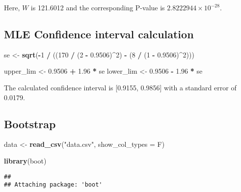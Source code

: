\documentclass[
  11pt,
]{article}
\newenvironment{Shaded}{\begin{snugshade}}{\end{snugshade}}
\newcommand{\AttributeTok}[1]{\textcolor[rgb]{0.13,0.29,0.53}{#1}}
\newcommand{\DecValTok}[1]{\textcolor[rgb]{0.00,0.00,0.81}{#1}}
\newcommand{\FloatTok}[1]{\textcolor[rgb]{0.00,0.00,0.81}{#1}}
\newcommand{\FunctionTok}[1]{\textcolor[rgb]{0.13,0.29,0.53}{\textbf{#1}}}
\newcommand{\NormalTok}[1]{#1}
\newcommand{\OtherTok}[1]{\textcolor[rgb]{0.56,0.35,0.01}{#1}}
\newcommand{\SpecialCharTok}[1]{\textcolor[rgb]{0.81,0.36,0.00}{\textbf{#1}}}
\newcommand{\StringTok}[1]{\textcolor[rgb]{0.31,0.60,0.02}{#1}}
\begin{document}
Here, \(W\) is 121.6012 and the corresponding P-value is
\ensuremath{2.8222944\times 10^{-28}}.

\hypertarget{mle-confidence-interval-calculation}{%
\subsection{MLE Confidence interval
calculation}\label{mle-confidence-interval-calculation}}

\begin{Shaded}
\begin{Highlighting}[]
\NormalTok{se }\OtherTok{\textless{}{-}} \FunctionTok{sqrt}\NormalTok{(}\SpecialCharTok{{-}}\DecValTok{1} \SpecialCharTok{/}\NormalTok{ ((}\DecValTok{170} \SpecialCharTok{/}\NormalTok{ (}\DecValTok{2} \SpecialCharTok{{-}} \FloatTok{0.9506}\NormalTok{)}\SpecialCharTok{\^{}}\DecValTok{2}\NormalTok{) }\SpecialCharTok{{-}}\NormalTok{ (}\DecValTok{8} \SpecialCharTok{/}\NormalTok{ (}\DecValTok{1} \SpecialCharTok{{-}} \FloatTok{0.9506}\NormalTok{)}\SpecialCharTok{\^{}}\DecValTok{2}\NormalTok{)))}

\NormalTok{upper\_lim }\OtherTok{\textless{}{-}} \FloatTok{0.9506} \SpecialCharTok{+} \FloatTok{1.96} \SpecialCharTok{*}\NormalTok{ se}
\NormalTok{lower\_lim }\OtherTok{\textless{}{-}} \FloatTok{0.9506} \SpecialCharTok{{-}} \FloatTok{1.96} \SpecialCharTok{*}\NormalTok{ se}
\end{Highlighting}
\end{Shaded}

The calculated confidence interval is {[}0.9155, 0.9856{]} with a
standard error of 0.0179.

\hypertarget{bootstrap-1}{%
\subsection{Bootstrap}\label{bootstrap-1}}

\begin{Shaded}
\begin{Highlighting}[]
\NormalTok{data }\OtherTok{\textless{}{-}} \FunctionTok{read\_csv}\NormalTok{(}\StringTok{"data.csv"}\NormalTok{, }\AttributeTok{show\_col\_types =}\NormalTok{ F)}

\FunctionTok{library}\NormalTok{(boot)}
\end{Highlighting}
\end{Shaded}

\begin{verbatim}
## 
## Attaching package: 'boot'
\end{verbatim}
\end{document}
